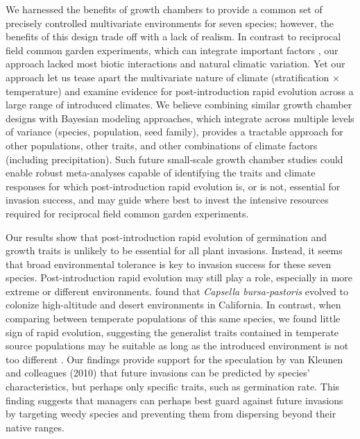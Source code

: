 \documentclass[12pt]{article}\usepackage[]{graphicx}\usepackage[]{color}
\begin{document}
	We harnessed the benefits of growth chambers to provide a common set of precisely controlled multivariate environments for seven species; however, the benefits of this design trade off with a lack of realism. In contrast to reciprocal field common garden experiments, which can integrate important factors \parencite{Germain2018,Blois2013}, our approach lacked most biotic interactions and natural climatic variation. Yet our approach let us tease apart the multivariate nature of climate (stratification $\times$ temperature) and examine evidence for post-introduction rapid evolution across a large range of introduced climates. We believe combining similar growth chamber designs with Bayesian modeling approaches, which integrate across multiple levels of variance (species, population, seed family), provides a tractable approach for other populations, other traits, and other combinations of climate factors (including precipitation). Such future small-scale growth chamber studies could enable robust meta-analyses capable of identifying the traits and climate responses for which post-introduction rapid evolution is, or is not, essential for invasion success, and may guide where best to invest the intensive resources required for reciprocal field common garden experiments. %
	
	Our results show that post-introduction rapid evolution of germination and growth traits is unlikely to be essential for all plant invasions. Instead, it seems that broad environmental tolerance is key to invasion success for these seven species. Post-introduction rapid evolution may still play a role, especially in more extreme or different environments.  \textcite{Linde2001} found that \textit{Capsella bursa-pastoris} evolved to colonize high-altitude and desert environments in California. In contrast, when comparing between temperate populations of this same species, we found little sign of rapid evolution, suggesting the generalist traits contained in temperate source populations may be suitable as long as the introduced environment is not too different \parencite{Baker1965}. Our findings provide support for  the speculation by van Kleunen and colleagues (2010) that future invasions can be predicted by species' characteristics, but perhaps only specific traits, such as germination rate. This finding suggests that managers can perhaps best guard against future invasions by targeting weedy species and preventing them from dispersing beyond their native ranges. 
	
\end{document}
